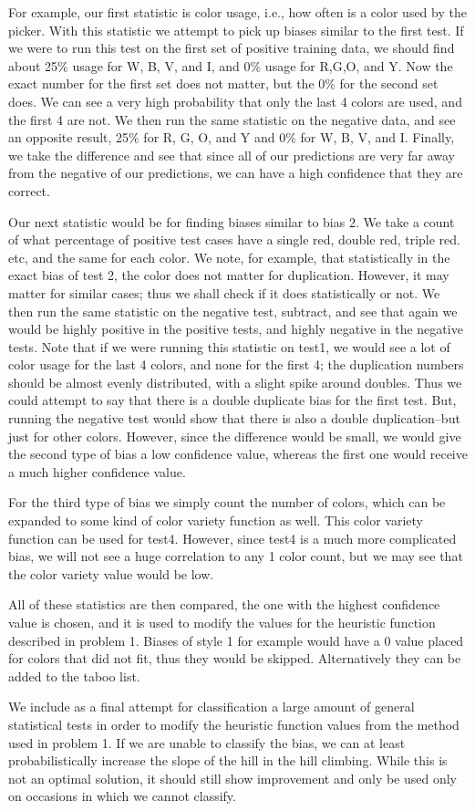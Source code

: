 \documentclass[11pt,twocolumn]{article}
\begin{document}
For example, our first statistic is color usage, i.e., how often is a color used by the picker. With
this statistic we attempt to pick up biases similar to the first test. If we were to run this test on the first
set of positive training data, we should find about 25\% usage for W, B, V, and I, and 0\% usage for R,G,O,
and Y. Now the exact number for the first set does not matter, but the 0\% for the second set does. We
can see a very high probability that only the last 4 colors are used, and the first 4 are not. We then run
the same statistic on the negative data, and see an opposite result, 25\% for R, G, O, and Y and 0\% for
W, B, V, and I. Finally, we take the difference and see that since all of our predictions are very far away
from the negative of our predictions, we can have a high confidence that they are correct.

Our next statistic would be for finding biases similar to bias 2. We take a count of what
percentage of positive test cases have a single red, double red, triple red. etc, and the same for each
color. We note, for example, that statistically  in the exact bias of test 2, the color does not matter for
duplication. However, it may matter for similar cases; thus we shall check if it does statistically or not. We then run the same statistic
on the negative test, subtract, and see that again we would be highly positive in the positive tests, and
highly negative in the negative tests. Note that if we were running this statistic on test1, we would see a
lot of color usage for the last 4 colors, and none for the first 4;  the duplication numbers should be
almost evenly distributed, with a slight spike around doubles. Thus we could attempt to say that there
is a double duplicate bias for the first test. But, running the negative test would show that there is also a
double duplication--but just for other colors. However, since the difference would be small, we would give
the second type of bias a low confidence value, whereas the first one would receive a much higher
confidence value.

For the third type of bias we simply count the number of colors, which can be expanded to some
kind of color variety function as well. This color variety function can be used for test4. However, since
test4 is a much more complicated bias, we will not see a huge correlation to any 1 color count, but we
may see that the color variety value would be low.

All of these statistics are then compared, the one with the highest confidence value is chosen,
and it is used to modify the values for the heuristic function described in problem 1. Biases of style 1 for
example would have a 0 value placed for colors that did not fit, thus they would be skipped.
Alternatively they can be added to the taboo list.

We include as a final attempt for classification a large amount of general statistical tests in
order to modify the heuristic function values from the method used in problem 1. If we are unable to
classify the bias, we can at least probabilistically increase the slope of the hill in the hill climbing. While
this is not an optimal solution, it should still show improvement and only
be used only on occasions in which we cannot classify.
\end{document}
